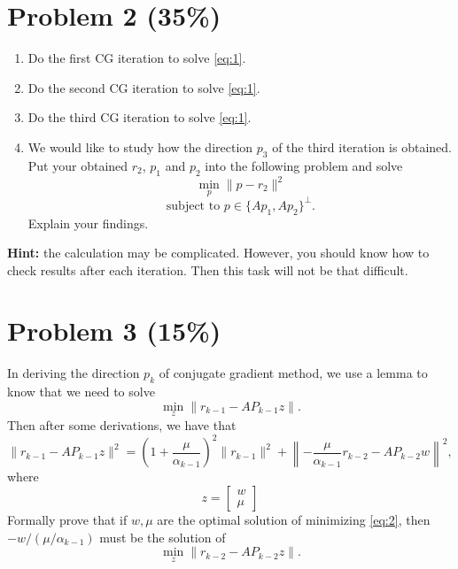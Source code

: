 \documentclass[12pt,a4paper]{article}
\begin{document}
\vspace{0.5cm}

\section*{Problem 2 (35\%)}

\begin{enumerate}
    \item Do the first CG iteration to solve \eqref{eq:1}.
    \item Do the second CG iteration to solve \eqref{eq:1}.
    \item Do the third CG iteration to solve \eqref{eq:1}.
    \item We would like to study how the direction $p_3$ of the third iteration is obtained. Put your obtained $r_2$, $p_1$ and $p_2$ into the following problem and solve
    \[
    \min_{p} \| p - r_2 \|^2 
    \]
    \[
    \text{subject to } p \in \{ Ap_1, Ap_2 \}^\perp.
    \]
    Explain your findings.
\end{enumerate}

\noindent \textbf{Hint:} the calculation may be complicated. However, you should know how to check results after each iteration. Then this task will not be that difficult.

\vspace{0.5cm}

\section*{Problem 3 (15\%)}

In deriving the direction $p_k$ of conjugate gradient method, we use a lemma to know that we need to solve
\[
\min_{z} \| r_{k-1} - AP_{k-1}z \|.
\]
Then after some derivations, we have that
\begin{equation}
\| r_{k-1} - AP_{k-1}z \|^2 = \left(1 + \frac{\mu}{\alpha_{k-1}}\right)^2 \| r_{k-1} \|^2 + \left\| - \frac{\mu}{\alpha_{k-1}} r_{k-2} - AP_{k-2}w \right\|^2, \label{eq:2}
\end{equation}
where 
\[
z = \begin{bmatrix} w \\ \mu \end{bmatrix}
\]
Formally prove that if $w, \mu$ are the optimal solution of minimizing \eqref{eq:2}, then $-w / (\mu/\alpha_{k-1})$ must be the solution of
\[
\min_{z} \| r_{k-2} - AP_{k-2}z \|.
\]

\vspace{0.5cm}
\end{document}
